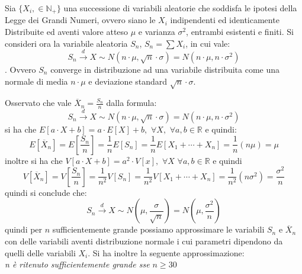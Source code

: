 \documentclass[a4paper,12pt, oneside]{book}
\newcommand{\numberset}{\mathbb}
\newcommand{\N}{\numberset{N}}
\newcommand{\R}{\numberset{R}}
\begin{document}
Sia $\{X_i,\in\N_+\}$ una successione di variabili aleatorie che soddisfa le ipotesi della Legge dei Grandi
Numeri, ovvero siano le $X_i$ indipendenti ed identicamente Distribuite ed aventi valore atteso $\mu$ e 
varianza $\sigma^2$, entrambi esistenti e finiti.\newline
Si consideri ora la variabile aleatoria $S_n$, $S_n = \sum X_i$, in cui vale:
\[S_n \stackrel{d}{\longrightarrow} X \sim N(n \cdot \mu, \sqrt{n} \cdot \sigma) = N(n \cdot \mu, n \cdot \sigma^2)\].
Ovvero $S_n$ converge in distribuzione ad una variabile distribuita come una normale di media $n \cdot \mu$ e
deviazione standard $\sqrt{n} \cdot \sigma$.

Osservato che vale $\overline{X}_n = \frac{S_n}{n}$ dalla formula:
\[S_n \stackrel{d}{\longrightarrow} X \sim N(n \cdot \mu, \sqrt{n} \cdot \sigma) = N(n \cdot \mu, n \cdot \sigma^2)\]
si ha che $E[a \cdot X + b] = a \cdot E[X] + b,\,\, \forall X,\,\, \forall a,b \in \R$ e quindi:
\[E[\overline{X}_n] = E\left[\frac{S_n}{n}\right] = \frac{1}{n}E[S_n] = \frac{1}{n} E[X_1+\cdots +X_n] = \frac{1}{n}(n\mu) = \mu\]
inoltre si ha che $V[a \cdot X + b] = a^2 \cdot V[x],\,\, \forall X \,\, \forall a,b \in \R$ e quindi
\[V[\overline{X}_n]=V\left[\frac{S_n}{n}\right]=\frac{1}{n^2}V[S_n]=\frac{1}{n^2}V[X_1+\cdots+X_n]=\frac{1}{n^2}(n\sigma^2)=\frac{\sigma^2}{n}\]
quindi si conclude che:
\[S_n\stackrel{d}{\longrightarrow}X\sim N(\mu, \frac{\sigma}{\sqrt{n}})=N(\mu, \frac{\sigma^2}{n})\]
quindi per $n$ sufficientemente grande possiamo approssimare le variabili $S_n$ e $\overline{X}_n$ con delle variabili aventi distribuzione normale i cui parametri dipendono da quelli delle variabili $X_i$. Si ha inoltre la seguente approssimazione:\\
\textit{n è ritenuto sufficientemente grande sse $n\geq 30$}
\end{document}
